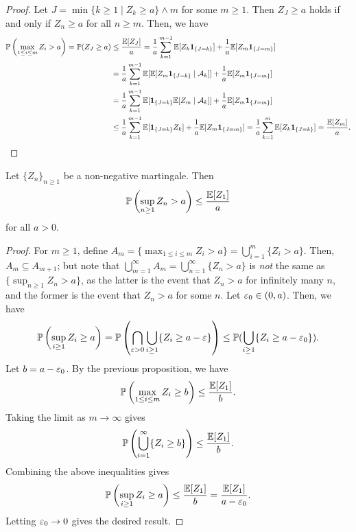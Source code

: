 \begin{proof}
    Let $J = \min\{k \geq 1 \mid Z_{k} \geq a\} \wedge m$ for some $m \geq 1$. Then $Z_{J} \geq a$ holds if and only if $Z_{n} \geq a$ for all $n \geq m$. Then, we have
    \begin{align}
        \mathbb{P}\left( \max_{1 \leq i \leq m} Z_{i} > a \right) = \mathbb{P}(Z_{J} \geq a) &\leq \frac{\mathbb{E}[Z_{J}]}{a} = \frac{1}{a} \sum_{k=1}^{m-1} \mathbb{E}[Z_{k} \textbf{1}_{\{J=k\}}] + \frac{1}{a} \mathbb{E}[Z_{m} \textbf{1}_{\{J=m\}}] \notag \\
        &= \frac{1}{a} \sum_{k=1}^{m-1} \mathbb{E}[\mathbb{E}[Z_{m} \textbf{1}_{\{J=k\}} \mid \mathcal{A}_{k}]] + \frac{1}{a} \mathbb{E}[Z_{m} \textbf{1}_{\{J=m\}}] \notag \\
        &= \frac{1}{a} \sum_{k=1}^{m-1} \mathbb{E}[\textbf{1}_{\{J=k\}} \mathbb{E}[Z_{m} \mid \mathcal{A}_{k}]] + \frac{1}{a} \mathbb{E}[Z_{m} \textbf{1}_{\{J=m\}}] \notag \\
        &\leq \frac{1}{a} \sum_{k=1}^{m-1} \mathbb{E}[\textbf{1}_{\{J=k\}} Z_{k}] + \frac{1}{a} \mathbb{E}[Z_{m} \textbf{1}_{\{J=m\}}] = \frac{1}{a} \sum_{k=1}^{m} \mathbb{E}[Z_{k} \textbf{1}_{\{J=k\}}] = \frac{\mathbb{E}[Z_{m}]}{a}.
    \end{align}
\end{proof}

\begin{proposition}
    Let $\{Z_{n}\}_{n \geq 1}$ be a non-negative martingale. Then
    \begin{align}
        \mathbb{P}\left( \sup_{n \geq 1} Z_{n} > a \right) \leq \frac{\mathbb{E}[Z_{1}]}{a}
    \end{align}
    for all $a > 0$.
\end{proposition}

\begin{proof}
    For $m \geq 1$, define $A_{m} = \{\max_{1 \leq i \leq m} Z_{i} > a\} = \bigcup_{i=1}^{m} \{Z_{i} > a\}$. Then, $A_{m} \subseteq A_{m+1}$; but note that $\bigcup_{m=1}^{\infty} A_{m} = \bigcup_{n=1}^{\infty} \{Z_{n} > a\}$ is \textit{not} the same as $\{\sup_{n \geq 1} Z_{n} > a\}$, as the latter is the event that $Z_{n} > a$ for infinitely many $n$, and the former is the event that $Z_{n} > a$ for some $n$. Let $\varepsilon_{0} \in (0,a)$. Then, we have
    \begin{align}
        \mathbb{P}\left( \sup_{i \geq 1} Z_{i} \geq a \right) = \mathbb{P}\left( \bigcap_{\varepsilon > 0} \bigcup_{i \geq 1} \{Z_{i} \geq a - \varepsilon\} \right) \leq \mathbb{P}(\bigcup_{i \geq 1} \{Z_{i} \geq a - \varepsilon_{0}\}).
    \end{align}
    Let $b = a-\varepsilon_{0}$. By the previous proposition, we have
    \begin{align}
        \mathbb{P}\left( \max_{1 \leq i \leq m} Z_{i} \geq b \right) \leq \frac{\mathbb{E}[Z_{1}]}{b}.
    \end{align}
    Taking the limit as $m \to \infty$ gives
    \begin{align}
        \mathbb{P}\left( \bigcup_{i=1}^{\infty} \{Z_{i} \geq b\} \right) \leq \frac{\mathbb{E}[Z_{1}]}{b}.
    \end{align}
    Combining the above inequalities gives
    \begin{align}
        \mathbb{P}\left( \sup_{i \geq 1} Z_{i} \geq a \right) \leq \frac{\mathbb{E}[Z_{1}]}{b} = \frac{\mathbb{E}[Z_{1}]}{a-\varepsilon_{0}}.
    \end{align}
    Letting $\varepsilon_{0} \to 0$ gives the desired result.
\end{proof}

